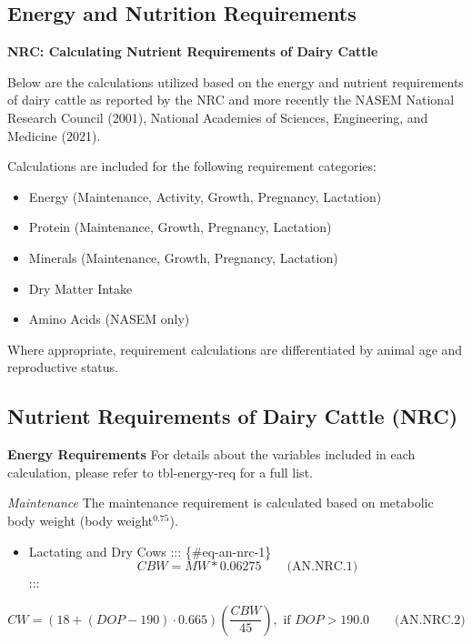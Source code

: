 \documentclass[
  letterpaper,
  oneside,
  openany]{scrbook}
\providecommand{\tightlist}{%
  \setlength{\itemsep}{0pt}\setlength{\parskip}{0pt}}
\begin{document}
\subsection{Energy and Nutrition
Requirements}\label{energy-and-nutrition-requirements}

\textbf{NRC: Calculating Nutrient Requirements of Dairy Cattle}

Below are the calculations utilized based on the energy and nutrient
requirements of dairy cattle as reported by the NRC and more recently
the NASEM National Research Council (2001), National Academies of
Sciences, Engineering, and Medicine (2021).

Calculations are included for the following requirement categories:

\begin{itemize}
\tightlist
\item
  Energy (Maintenance, Activity, Growth, Pregnancy, Lactation)
\item
  Protein (Maintenance, Growth, Pregnancy, Lactation)
\item
  Minerals (Maintenance, Growth, Pregnancy, Lactation)
\item
  Dry Matter Intake
\item
  Amino Acids (NASEM only)
\end{itemize}

Where appropriate, requirement calculations are differentiated by animal
age and reproductive status.

\subsection{Nutrient Requirements of Dairy Cattle
(NRC)}\label{nutrient-requirements-of-dairy-cattle-nrc}

\textbf{Energy Requirements} For details about the variables included in
each calculation, please refer to tbl-energy-req for a full list.

\emph{Maintenance} The maintenance requirement is calculated based on
metabolic body weight (body weight\(^{0.75}\)).

\begin{itemize}
\tightlist
\item
  Lactating and Dry Cows ::: \{\#eq-an-nrc-1\} \[
  CBW = MW * 0.06275 \qquad \text{(AN.NRC.1)}
  \] :::
\end{itemize}

\protect{}\label{eq-an-nrc-2}
\[
CW = (18 + (DOP - 190)\cdot 0.665)\left(\frac{CBW}{45}\right), \text{ if } DOP > 190.0
\qquad \text{(AN.NRC.2)}
\]
\end{document}
